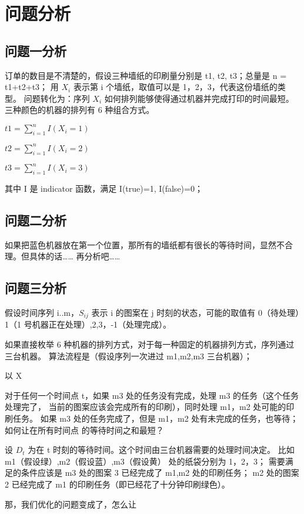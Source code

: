 \documentclass[bwprint]{cumcmthesis}    %
\begin{document}
\section{问题分析}
\subsection{问题一分析}
订单的数目是不清楚的，假设三种墙纸的印刷量分别是 t1, t2, t3；总量是 n = t1+t2+t3；
用 $X_i$ 表示第 i 个墙纸，取值可以是 1，2，3，代表这份墙纸的类型。
问题转化为：序列 {$X_i$} 如何排列能够使得通过机器并完成打印的时间最短。
三种颜色的机器的排列有 6 种组合方式。

$t1 = \sum_{i=1}^{n}{I(X_i=1)}$

$t2 = \sum_{i=1}^{n}{I(X_i=2)}$

$t3 = \sum_{i=1}^{n}{I(X_i=3)}$

其中 I 是 indicator 函数，满足 I(true)=1, I(false)=0；

\subsection{问题二分析}

如果把蓝色机器放在第一个位置，那所有的墙纸都有很长的等待时间，显然不合理。但具体的话……
再分析吧……

\subsection{问题三分析}

假设时间序列 i..m，$S_{ij}$ 表示 i 的图案在 j 时刻的状态，可能的取值有 0（待处理）1（1 号机器正在处理）,2,3，-1（处理完成）。

如果直接枚举 6 种机器的排列方式，对于每一种固定的机器排列方式，序列通过三台机器。
算法流程是（假设序列一次进过 m1,m2,m3 三台机器）；

以 X

对于任何一个时间点 t，如果 m3 处的任务没有完成，处理 m3 的任务（这个任务处理完了，
当前的图案应该会完成所有的印刷），同时处理 m1，m2 处可能的印刷任务。
如果 m3 处的任务完成了，但是 m1，m2 处有未完成的任务，也等待；
如何让在所有时间点 的等待时间之和最短？

设 $D_t$ 为在 t 时刻的等待时间。这个时间由三台机器需要的处理时间决定。
比如 m1（假设绿）,m2（假设蓝）,m3（假设黄） 处的纸袋分别为 1，2，3；
需要满足的条件应该是 m3 处的图案 3 已经完成了 m1,m2 处的印刷任务；
m2 处的图案 2 已经完成了 m1 的印刷任务（即已经花了十分钟印刷绿色）。

那，我们优化的问题变成了，怎么让
\end{document}
